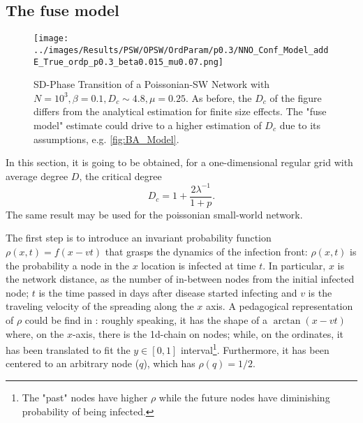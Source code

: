 \documentclass[a4paper,10pt,twoside]{book} %
\theoremstyle{definition}
\begin{document}
\subsection*{The fuse model}
\label{sec:D_c_fuse_model}
\begin{figure}[t]
	\texttt{[image: ../images/Results/PSW/OPSW/OrdParam/p0.3/NNO\_Conf\_Model\_addE\_True\_ordp\_p0.3\_beta0.015\_mu0.07.png]}
	\centering
	\caption{SD-Phase Transition of a Poissonian-SW Network with $N = 10^{3}, \beta = 0.1, D_c \sim 4.8, \mu = 0.25$. As before, the $D_c$ of the figure differs from the analytical estimation for finite size effects. The "fuse model" estimate could drive to a higher estimation of $ D_c$ due to its assumptions, e.g. \autoref{fig:BA_Model}.}
	\label{fig:SD_Threshold_Fuse_Model}
\end{figure}

In this section, it is going to be obtained, for a one-dimensional regular grid with average degree $D$, the critical degree \cite{Thurner::NetBasedExpl} 
\begin{equation}
	D_c = 1 + \frac{2 \lambda^{-1}}{1+p}.
	\label{eq:Dc_PSW_network}
\end{equation}
The same result may be used for the poissonian small-world network.

The first step is to introduce an invariant probability function $\rho(x,t) = f(x-vt)$ that grasps the dynamics of the infection front: $\rho(x,t)$ is the probability a node in the $x$ location is infected at time $t$.
In particular, $x$ is the network distance, as the number of in-between nodes from the initial infected node; $t$ is the time passed in days after disease started infecting and $v$ is the traveling velocity of the spreading along the $x$ axis.
A pedagogical representation of $\rho$ could be find in \cite{Thurner::Appendix_NetBasedExpl}: roughly speaking, it has the shape of a $\arctan(x-vt)$ where, on the $x$-axis, there is the 1d-chain on  nodes; while, on the ordinates, it has been translated to fit the $y \in [0,1]$ interval\footnote{The "past" nodes have higher $\rho$ while the future nodes have diminishing probability of being infected.}.   Furthermore, it has been centered to an arbitrary node ($q$), which has $\rho(q) = 1/2$.
\end{document}
